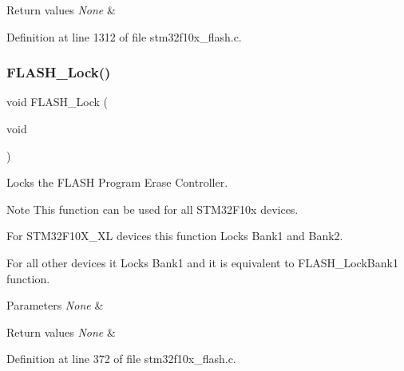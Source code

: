 \begin{DoxyRetVals}{Return values}
{\em None} & \\
\hline
\end{DoxyRetVals}


Definition at line 1312 of file stm32f10x\+\_\+flash.\+c.

\mbox{\label{group___f_l_a_s_h___exported___functions_ga46899557353c4312ddbe3f25e65df1d8}} 
\subsubsection{\texorpdfstring{F\+L\+A\+S\+H\+\_\+\+Lock()}{FLASH\_Lock()}}
{\footnotesize\ttfamily void F\+L\+A\+S\+H\+\_\+\+Lock (\begin{DoxyParamCaption}\item[{void}]{ }\end{DoxyParamCaption})}



Locks the F\+L\+A\+SH Program Erase Controller. 

\begin{DoxyNote}{Note}
This function can be used for all S\+T\+M32\+F10x devices.
\begin{DoxyItemize}
\item For S\+T\+M32\+F10\+X\+\_\+\+XL devices this function Locks Bank1 and Bank2.
\item For all other devices it Locks Bank1 and it is equivalent to F\+L\+A\+S\+H\+\_\+\+Lock\+Bank1 function. 
\end{DoxyItemize}
\end{DoxyNote}

\begin{DoxyParams}{Parameters}
{\em None} & \\
\hline
\end{DoxyParams}

\begin{DoxyRetVals}{Return values}
{\em None} & \\
\hline
\end{DoxyRetVals}


Definition at line 372 of file stm32f10x\+\_\+flash.\+c.

